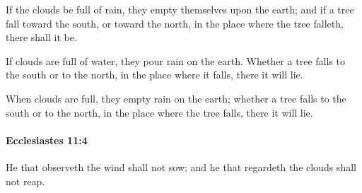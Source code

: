 			\begin{versebox}
					\item[BHS] 
					\item[LXX] 
					\item[ASV] If the clouds be full of rain, they empty themselves upon the earth; and if a tree fall toward the south, or toward the north, in the place where the tree falleth, there shall it be.
					\item[NIV] If clouds are full of water, they pour rain on the earth. Whether a tree falls to the south or to the north, in the place where it falls, there it will lie.
					\item[NRSV] When clouds are full, they empty rain on the earth; whether a tree falls to the south or to the north, in the place where the tree falls, there it will lie.
			\end{versebox}

		\paragraph{Ecclesiastes 11:4} %
			\label{ECCLESIASTES-11-4}

			He that observeth the wind shall not sow; and he that regardeth the clouds shall not reap.

